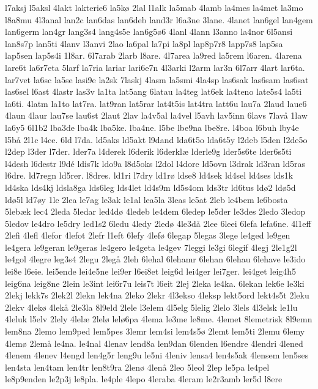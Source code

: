 {l7aksj
l5aksl
4lakt
lakterie6
la5kø
2lal
l1alk
la5mab
4lamb
la4mes
la4met
la3mo
l8a8mu
4l3anal
lan2c
lan6das
lan6deb
land3r
l6a3ne
3lane.
4lanet
lan6gel
lan4gem
lan6germ
lan4gr
lang3s4
lang4s5e
lan6g5ø6
4lanl
4lann
l3anno
la4nor
6l5ansi
lan8s7p
lan5ti
4lanv
l3anvi
2lao
la6pal
la7pi
la8pl
lap8p7r8
lapp7s8
lap5sa
lap5sen
lap5s4i
1l8ar.
6l7arab
2larb
l8are.
4l7area
la9red
la5rem
l6aren.
4larena
lare6t
la6r7eta
5larf
la7ria
lariar
lari6e7n
4l3arki
l2arm
lar3n
6l7arr
4lart
lar6ta.
lar7vet
la6sc
la5se
lasi9e
la2sk
7laskj
4lasm
la5smi
4la4sp
las6sak
las6sam
las6sat
las6sel
l6ast
4lastr
las3v
la1ta
lat5ang
6latau
la4teg
lat6ek
la4teno
late5s4
la5ti
la6ti.
4latm
la1to
lat7ra.
lat9ran
lat5rar
lat4t5is
lat4tra
latt6u
lau7a
2laud
laue6
4laun
4laur
lau7se
lau6st
2laut
2lav
la4v5al
la4vel
l5avh
lav5inn
6lavs
7lavå
1law
la6y5
6l1b2
lba3de
lba4k
lba5ke.
lba4ne.
l5be
lbe9na
lbe8re.
l4boa
l6buh
lby4e
l5bå
2l1c
l4ce.
6ld
l7da.
ld5aks
ld5akt
l9dand
lda6t5o
lda6t5y
l2deb
l5den
l2de5o
l2dep
l3der
l7der.
lder7a
l4derek
l6derik
l6derklæ
lderle9g
lder5s6te
lder6s5ti
l4desh
l6destr
l9dé
ldis7k
ldo9a
l8d5oks
l2dol
l4dore
ld5ovn
l3drak
ld3ran
ld5ras
l6dre.
ld7regn
ld5rer.
l8dres.
ld1ri
l7dry
ld1rø
ldse8
ld4sek
ld4sel
ld4ses
lds1k
ld4ska
lds4kj
ldsla8ga
lds6leg
lds4let
ld4s9m
ld5s4om
lds3tr
ld6tus
ldø2
ldø5d
ldø5l
ld7øy
1le
2lea
le7ag
le3ak
le1al
lea5la
3leas
le5at
2leb
le4bem
le6bosta
5lebæk
lec4
2leda
5ledar
led4dø
4ledeb
le4dem
6ledep
le5der
le3des
2ledo
3ledop
5ledov
le4dro
le5dry
led1s2
6ledu
4ledy
2ledø
4le3då
2lee
6leei
6lefa
lefa6ne.
4l1eff
2lefi
4lefl
4lefor
4lefot
2lefr
l1eft
6lefy
4lefø
6legap
5legas
3lege
le4ged
le9gen
le4gera
le9geran
le9geras
le4gero
le4geta
le4gev
7leggi
le3gi
6legif
4legj
2le1g2l
le4gol
4legre
leg3s4
2legu
2legå
2leh
6lehal
6lehamr
6lehan
6lehau
6lehave
le3ido
lei8e
l6eie.
lei5ende
lei4e5ne
lei9er
l6ei8et
leig6d
lei4ger
lei7ger.
lei4get
leig4h5
leig6na
leig8ne
2lein
le3int
lei6r7u
leis7t
l6eit
2lej
2leka
le4ka.
6lekan
lek6e
le3ki
2lekj
lekk7s
2lek2l
2lekn
lek4na
2leko
2lekr
4l3ekso
4leksp
lekt5ord
lekt4s5t
2leku
2lekv
4lekø
4lekå
2le3la
8l9eld
2lele
l3elem
4l5elg
5lelig
2lelo
3lels
4l3elsk
le1lu
4leluk
l5elv
2lely
4lelæ
2lelø
lelø6pa
4lema
le3me
le8me.
4lemet
8lemetrisk
8l9emn
lem8na
2lemo
lem9ped
lem5pes
3lemr
lem4si
lem4s5ø
2lemt
lem5ti
2lemu
6lemy
4lemø
2lemå
le4na.
le4nal
4lenav
lend8a
len9dan
6lenden
l6endre
4lendri
4lened
4lenem
4lenev
l4engd
len4g5r
leng9u
le5ni
4leniv
lensa4
len4s5ak
4lensem
len5ses
len4sta
len4tam
len4tr
len8t9ra
2lenø
4lenå
2leo
5leol
2lep
le5pa
le4pel
le8p9enden
le2p3j
le8pla.
le4ple
4lepo
4leraba
4leram
le2r3amb
ler5d
l8ere
}
